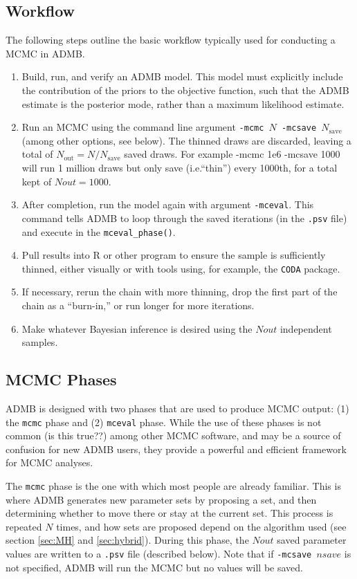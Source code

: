 \documentclass{article}\usepackage[]{graphicx}\usepackage[]{color}
\begin{document}
\subsection{Workflow}
The following steps outline the basic workflow typically
used for conducting a MCMC in ADMB.
\begin{enumerate}
\item Build, run, and verify an ADMB model. This model must
  explicitly include the contribution of the priors to the
  objective function, such that the ADMB estimate is the
  posterior mode, rather than a maximum likelihood estimate.
\item Run an MCMC using the command line argument
  \texttt{-mcmc $N$ -mcsave $N_{\text{save}}$} (among other
  options, see below). The thinned draws are discarded,
  leaving a total of $N_{\text{out}}=N/N_{\text{save}}$
  saved draws. For example -mcmc 1e6 -mcsave 1000
  will run 1 million draws but only save (i.e.``thin'')
  every 1000th, for a total kept of $Nout=1000$.
\item After completion, run the model again with argument
  \texttt{-mceval}. This command tells ADMB to loop through
  the saved iterations (in the \texttt{.psv} file) and
  execute in the \texttt{mceval\_phase()}.
\item Pull results into R or other program to ensure the
  sample is sufficiently thinned, either visually or with
  tools using, for example, the \texttt{CODA} package.
\item If necessary, rerun the chain with more thinning, drop
  the first part of the chain as a ``burn-in,'' or run
  longer for more iterations.
\item Make whatever Bayesian inference is desired using the
  $Nout$ independent samples.
\end{enumerate}

\subsection{MCMC Phases}
ADMB is designed with two phases that are used to produce
MCMC output: (1) the \texttt{mcmc} phase and (2)
\texttt{mceval} phase. While the use of these phases is not
common (is this true??) among other MCMC software, and may
be a source of confusion for new ADMB users, they provide a
powerful and efficient framework for MCMC analyses.

The \texttt{mcmc} phase is the one with which most people
are already familiar. This is where ADMB generates new
parameter sets by proposing a set, and then determining
whether to move there or stay at the current set. This
process is repeated $N$ times, and how sets are proposed
depend on the algorithm used (see section \ref{sec:MH} and
\ref{sec:hybrid}). During this phase, the $Nout$ saved
parameter values are written to a \texttt{.psv} file
(described below). Note that if \texttt{-mcsave $nsave$} is
not specified, ADMB will run the MCMC but no values will be
saved.
\end{document}
